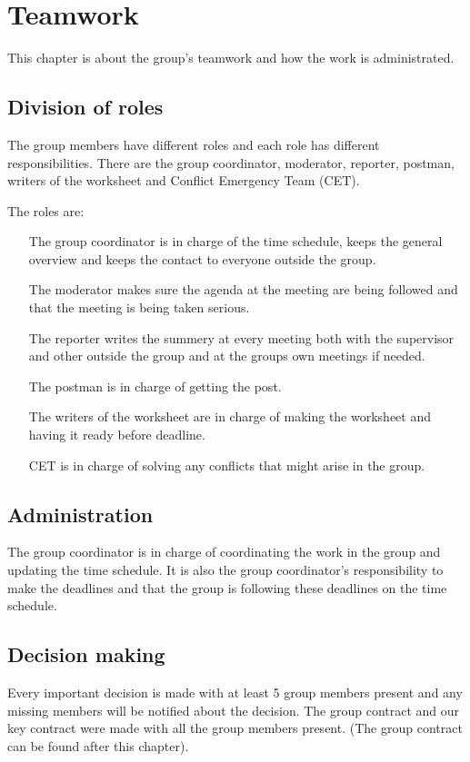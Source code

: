 \chapter{Teamwork}
This chapter is about the group's teamwork and how the work is administrated.
\section{Division of roles}
The group members have different roles and each role has different responsibilities. There are the group coordinator, moderator, reporter, postman, writers of the worksheet and Conflict Emergency Team (CET).

The roles are:
\begin{itemize}
\item [The group coordinator is in charge of the time schedule, keeps the general overview and keeps the contact to everyone outside the group.]
\item [The moderator makes sure the agenda at the meeting are being followed and that the meeting is being taken serious.]
\item [The reporter writes the summery at every meeting both with the supervisor and other outside the group and at the groups own meetings if needed.]
\item [The postman is in charge of getting the post.]
\item [The writers of the worksheet are in charge of making the worksheet and having it ready before deadline.]
\item [CET is in charge of solving any conflicts that might arise in the group.]
\end{itemize}

\section{Administration}
The group coordinator is in charge of coordinating the work in the group and updating the time schedule. It is also the group coordinator's responsibility to make the deadlines and that the group is following these deadlines on the time schedule.
\section{Decision making}
Every important decision is made with at least 5 group members present and any missing members will be notified about the decision. The group contract and our key contract were made with all the group members present. (The group contract can be found after this chapter).
